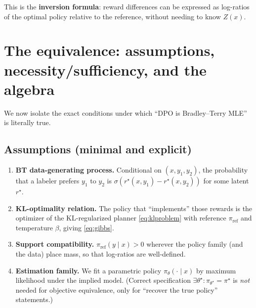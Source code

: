 \documentclass[11pt]{article}
\newcommand{\1}{\mathbf{1}}
\newcommand{\sigmoid}{\sigma}
\theoremstyle{plain}
\theoremstyle{definition}
\theoremstyle{remark}
\begin{document}
\begin{keypoint}
This is the \textbf{inversion formula}: reward differences can be expressed as log-ratios of the optimal policy relative to the reference, without needing to know $Z(x)$.
\end{keypoint}

\newpage
\section{The equivalence: assumptions, necessity/sufficiency, and the algebra}
We now isolate the exact conditions under which ``DPO is Bradley--Terry MLE'' is literally true.

\subsection{Assumptions (minimal and explicit)}
\begin{enumerate}[label=(A\arabic*)]
\item \textbf{BT data-generating process.} Conditional on $(x,y_1,y_2)$, the probability that a labeler prefers $y_1$ to $y_2$ is
$\sigmoid(r^\star(x,y_1)-r^\star(x,y_2))$ for some latent $r^\star$.
\item \textbf{KL-optimality relation.} The policy that ``implements'' those rewards is the optimizer of the KL-regularized planner
\eqref{eq:klproblem} with reference $\pi_{\mathrm{ref}}$ and temperature $\beta$, giving \eqref{eq:gibbs}.
\item \textbf{Support compatibility.} $\pi_{\mathrm{ref}}(y\mid x)>0$ wherever the policy family (and the data) place mass, so that
log-ratios are well-defined.
\item \textbf{Estimation family.} We fit a parametric policy $\pi_\theta(\cdot\mid x)$ by maximum likelihood under the implied model.
(Correct specification $\exists\theta^\star:\pi_{\theta^\star}=\pi^\star$ is \emph{not} needed for objective equivalence, only for
``recover the true policy'' statements.)
\end{enumerate}
\end{document}
